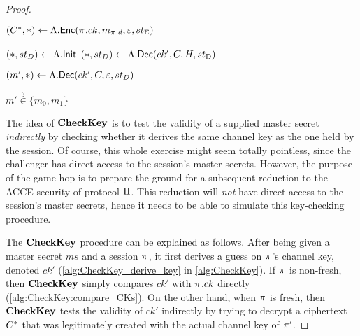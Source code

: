 \begin{proof}
\begin{algorithm}
\begin{algorithmic}[1]
		\State {}

		\State $(\Ctarget, *) \gets \stae.\staeenc(\oracle.ck, m_{\oracle.d}, \emptystring, \stE)$
		\hspace{1em}   \label{alg:CheckKey:encrypt_mb}		
		

		\State

		\State {}
		\State $(*, st_D) \gets \Lambda.\mathsf{Init}$ \label{alg:CheckKey:recreate_state:init}
			\State $(*, st_D) \gets \Lambda.\mathsf{Dec}(ck',C,H, st_{\mathrm{D}})$\label{alg:CheckKey:recreate_state:decrypt}
		\EndFor
 
		\State
		\State {}
		\State\label{alg:CheckKey_line_decrypt} $(m',*) \gets \Lambda.\mathsf{Dec}(ck', C, \varepsilon, st_D)$

		\State
		\State \Return $m' \overset{?}{\in} \lbrace m_0, m_1 \rbrace$
	
	\EndIf
\end{algorithmic}


\end{algorithm}


The idea of $\mathbf{CheckKey}$ is to test the validity of a supplied master secret \emph{indirectly} by checking whether it derives the same channel key as the one held by the session.
Of course,
this whole exercise might seem totally pointless,
since the challenger has direct access to the session's master secrets.
However,
the purpose of the game hop is to prepare the ground for a subsequent reduction to the ACCE security of protocol $\mathrm{\Pi}$.
This reduction will \emph{not} have direct access to the session's master secrets,
hence it needs to be able to simulate this key-checking procedure.

The $\mathbf{CheckKey}$ procedure can be explained as follows.
After being given a master secret $ms$ and a session $\oracle$,
it first derives a guess on $\oracle$'s channel key,
denoted $ck'$ (\cref{alg:CheckKey_derive_key} in \cref{alg:CheckKey}).
If $\oracle$ is non-fresh,
then $\mathbf{CheckKey}$ simply compares $ck'$ with $\oracle.ck$ directly (\cref{alg:CheckKey:compare_CKs}).
On the other hand,
when $\oracle$ is fresh,
then $\mathbf{CheckKey}$ tests the validity of $ck'$ indirectly by trying to decrypt a ciphertext $C^*$ that was legitimately created with the actual channel key of $\oracle'$.


\end{proof}
